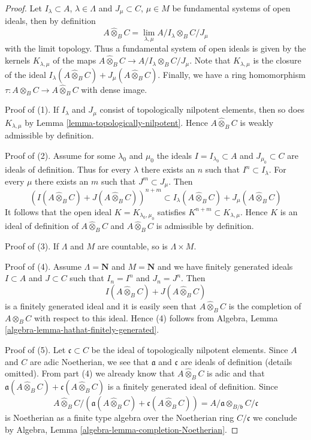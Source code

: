\begin{proof}
Let $I_\lambda \subset A$, $\lambda \in \Lambda$ and
$J_\mu \subset C$, $\mu \in M$
be fundamental systems of open ideals, then by definition
$$
A \widehat{\otimes}_B C =
\lim_{\lambda, \mu} A/I_\lambda \otimes_B C/J_\mu
$$
with the limit topology. Thus a fundamental system of open ideals
is given by the kernels $K_{\lambda, \mu}$ of the maps
$A \widehat{\otimes}_B C \to A/I_\lambda \otimes_B C/J_\mu$.
Note that $K_{\lambda, \mu}$ is the closure of the ideal
$I_\lambda(A \widehat{\otimes}_B C) + J_\mu(A \widehat{\otimes}_B C)$.
Finally, we have a ring homomorphism
$\tau : A \otimes_B C \to A \widehat{\otimes}_B C$ with dense image.

\medskip\noindent
Proof of (1). If $I_\lambda$ and $J_\mu$ consist of topologically
nilpotent elements, then so does $K_{\lambda, \mu}$ by
Lemma \ref{lemma-topologically-nilpotent}. Hence 
$A \widehat{\otimes}_B C$ is weakly admissible by definition.

\medskip\noindent
Proof of (2). Assume for some $\lambda_0$ and $\mu_0$ the ideals
$I = I_{\lambda_0} \subset A$ and $J_{\mu_0} \subset C$ are ideals of
definition. Thus for every $\lambda$ there exists an $n$ such that
$I^n \subset I_\lambda$. For every $\mu$ there exists an $m$ such that
$J^m \subset J_\mu$. Then
$$
\left(I(A \widehat{\otimes}_B C) + J(A \widehat{\otimes}_B C)\right)^{n + m}
\subset
I_\lambda(A \widehat{\otimes}_B C) + J_\mu(A \widehat{\otimes}_B C)
$$
It follows that the open ideal $K = K_{\lambda_0, \mu_0}$
satisfies $K^{n + m} \subset K_{\lambda, \mu}$. Hence $K$
is an ideal of definition of $A \widehat{\otimes}_B C$
and $A \widehat{\otimes}_B C$ is admissible by definition.

\medskip\noindent
Proof of (3). If $\Lambda$ and $M$ are countable, so is
$\Lambda \times M$.

\medskip\noindent
Proof of (4). Assume $\Lambda = \mathbf{N}$ and $M = \mathbf{N}$
and we have finitely generated ideals $I \subset A$ and $J \subset C$
such that $I_n = I^n$ and $J_n = J^n$. Then
$$
I(A \widehat{\otimes}_B C) + J(A \widehat{\otimes}_B C)
$$
is a finitely generated ideal and it is easily seen that
$A \widehat{\otimes}_B C$ is the completion of
$A \otimes_B C$ with respect to this ideal. Hence (4)
follows from Algebra, Lemma \ref{algebra-lemma-hathat-finitely-generated}.

\medskip\noindent
Proof of (5).
Let $\mathfrak c \subset C$ be the ideal of topologically nilpotent elements.
Since $A$ and $C$ are adic Noetherian, we see that
$\mathfrak a$ and $\mathfrak c$ are ideals of definition (details omitted).
From part (4) we already know that
$A \widehat{\otimes}_B C$ is adic and that
$\mathfrak a(A \widehat{\otimes}_B C) + \mathfrak c(A \widehat{\otimes}_B C)$
is a finitely generated ideal of definition. Since
$$
A \widehat{\otimes}_B C /
\left(\mathfrak a(A \widehat{\otimes}_B C) +
\mathfrak c(A \widehat{\otimes}_B C)\right)
=
A/\mathfrak a \otimes_{B/\mathfrak b} C/\mathfrak c
$$
is Noetherian as a finite type algebra over the Noetherian ring
$C/\mathfrak c$ we conclude by
Algebra, Lemma \ref{algebra-lemma-completion-Noetherian}.
\end{proof}
